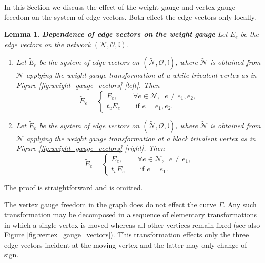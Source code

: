 \documentclass[11pt]{amsart}
\theoremstyle{plain}
\numberwithin{equation}{section}
\newtheorem{lemma}[theorem]{Lemma}
\begin{document}
In this Section we discuss the effect of the weight gauge and vertex gauge feeedom on the system of edge vectors. Both effect the edge vectors only locally.

\begin{lemma}\label{lem:weight_gauge}\textbf{Dependence of edge vectors on the weight gauge}
Let $E_e$ be the edge vectors on the network $({\mathcal N}, {\mathcal O}, \mathfrak{l})$.
\begin{enumerate}
\item Let ${\tilde E}_e$ be the system of edge vectors on $(\tilde {\mathcal N}, {\mathcal O}, \mathfrak{l})$, where $\tilde {\mathcal N}$ is obtained from ${\mathcal N}$ applying the weight gauge transformation at a white trivalent vertex as in Figure \ref{fig:weight_gauge_vectors} [left]. Then 
\begin{equation}\label{eq:wg_vector_white}
{\tilde E}_e = \left\{ \begin{array}{ll} E_e, &\quad  \forall e\in \mathcal N, \;\; e\not = e_1,e_2,\\
t_u E_e &\quad \mbox{ if } e = e_1,e_2.
\end{array}
\right.
\end{equation}
\item Let ${\tilde E}_e$ be the system of edge vectors on $(\tilde {\mathcal N}, {\mathcal O}, \mathfrak{l})$, where $\tilde {\mathcal N}$ is obtained from ${\mathcal N}$ applying the weight gauge transformation at a black trivalent vertex as in Figure \ref{fig:weight_gauge_vectors} [right]. Then
\begin{equation}\label{eq:wg_vector_black}
{\tilde E}_e = \left\{ \begin{array}{ll} E_e, &\quad \forall e\in \mathcal N, \;\;  e\not = e_1,\\
t_v E_e &\quad \mbox{ if } e = e_1.
\end{array}
\right.
\end{equation}
\end{enumerate}
\end{lemma}

The proof is straightforward and is omitted.

The vertex gauge freedom in the graph does do not effect the curve $\Gamma$.
Any such transformation may be decomposed in a sequence of elementary transformations in which a single vertex is moved whereas all other vertices remain fixed (see also Figure \ref{fig:vertex_gauge_vectors}).
This transformation effects only the three edge vectors incident at the moving vertex and the latter may only change of sign. 
\end{document}
